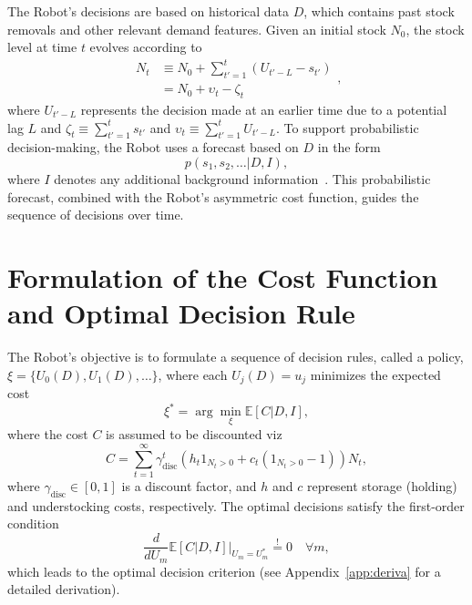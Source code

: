 \documentclass[a4paper,12pt]{article}
\theoremstyle{definition}
\begin{document}
	The Robot’s decisions are based on historical data $D$, which contains past stock removals and other relevant demand features. Given an initial stock $N_0$, the stock level at time $t$ evolves according to
	\begin{equation}
		\begin{split}
			N_t &\equiv N_0 + \sum_{t'=1}^{t} (U_{t'-L} - s_{t'})\\
			& = N_0+\upsilon_t-\zeta_t
		\end{split},
	\end{equation}
	where $U_{t'-L}$ represents the decision made at an earlier time due to a potential lag $L$ and $\zeta_t\equiv \sum_{t'=1}^ts_{t'}$ and $\upsilon_t\equiv \sum_{t'=1}^tU_{t'-L}$. To support probabilistic decision-making, the Robot uses a forecast based on $D$ in the form
	\begin{equation}
		p(s_1, s_2, \dots | D, I),
	\end{equation}
	where $I$ denotes any additional background information~\citep{Sivia2006}. This probabilistic forecast, combined with the Robot's asymmetric cost function, guides the sequence of decisions over time.
	
	\section{Formulation of the Cost Function and Optimal Decision Rule}
	The Robot’s objective is to formulate a sequence of decision rules, called a policy, $\xi = \{U_0(D), U_1(D), \dots\}$, where each $U_j(D) = u_j$ minimizes the expected cost
	\begin{equation}
		\xi^* = \arg \min_{\xi} \mathbb{E}[C | D, I],
	\end{equation}
	where the cost $C$ is assumed to be discounted viz
	\begin{equation}
		C = \sum_{t=1}^{\infty} \gamma_{\text{disc}}^{t} \left( h_t 1_{N_t> 0} + c_t (1_{N_t> 0}-1) \right)N_t,
		\label{eq:cost}
	\end{equation}
	where $\gamma_{\text{disc}} \in [0,1]$ is a discount factor, and $h$ and $c$ represent storage (holding) and understocking costs, respectively. The optimal decisions satisfy the first-order condition
	\begin{equation}
		\frac{d}{dU_m} \mathbb{E}[C | D, I] \Big|_{U_m = U_m^*} \overset{!}{=} 0 \quad \forall m,
		\label{eq:min_exp_cost}
	\end{equation}
	which leads to the optimal decision criterion (see Appendix~\ref{app:deriva} for a detailed derivation).
	
\end{document}
